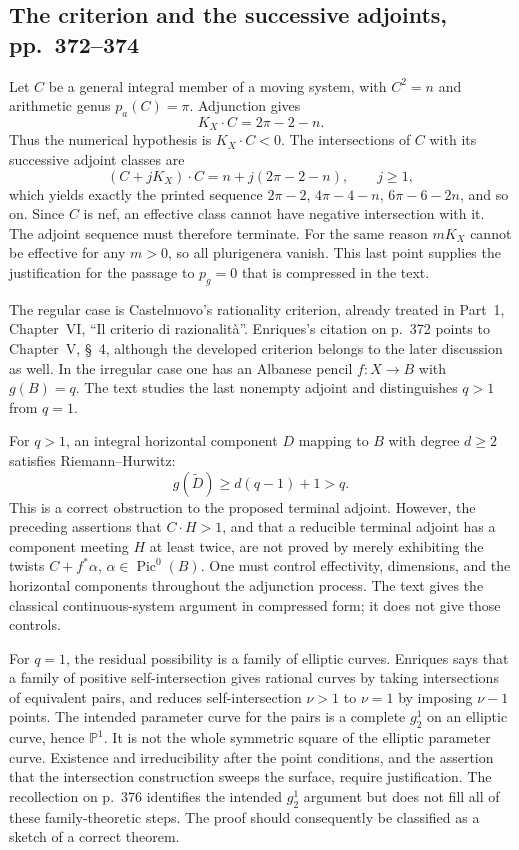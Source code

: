 \subsection{The criterion and the successive adjoints, pp.~372--374}

Let $C$ be a general integral member of a moving system, with $C^2=n$ and arithmetic genus $p_a(C)=\pi$. Adjunction gives
\[
 K_X\cdot C=2\pi-2-n.
\]
Thus the numerical hypothesis is $K_X\cdot C<0$. The intersections of $C$ with its successive adjoint classes are
\[
 (C+jK_X)\cdot C=n+j(2\pi-2-n),\qquad j\geq1,
\]
which yields exactly the printed sequence $2\pi-2$, $4\pi-4-n$, $6\pi-6-2n$, and so on. Since $C$ is nef, an effective class cannot have negative intersection with it. The adjoint sequence must therefore terminate. For the same reason $mK_X$ cannot be effective for any $m>0$, so all plurigenera vanish. This last point supplies the justification for the passage to $p_g=0$ that is compressed in the text.

The regular case is Castelnuovo's rationality criterion, already treated in Part~1, Chapter~VI, ``Il criterio di razionalit\`a''. Enriques's citation on p.~372 points to Chapter~V, \S~4, although the developed criterion belongs to the later discussion as well. In the irregular case one has an Albanese pencil $f:X\to B$ with $g(B)=q$. The text studies the last nonempty adjoint and distinguishes $q>1$ from $q=1$.

For $q>1$, an integral horizontal component $D$ mapping to $B$ with degree $d\geq2$ satisfies Riemann--Hurwitz:
\[
 g(\widetilde D)\geq d(q-1)+1>q.
\]
This is a correct obstruction to the proposed terminal adjoint. However, the preceding assertions that $C\cdot H>1$, and that a reducible terminal adjoint has a component meeting $H$ at least twice, are not proved by merely exhibiting the twists $C+f^*\alpha$, $\alpha\in\operatorname{Pic}^0(B)$. One must control effectivity, dimensions, and the horizontal components throughout the adjunction process. The text gives the classical continuous-system argument in compressed form; it does not give those controls.

For $q=1$, the residual possibility is a family of elliptic curves. Enriques says that a family of positive self-intersection gives rational curves by taking intersections of equivalent pairs, and reduces self-intersection $\nu>1$ to $\nu=1$ by imposing $\nu-1$ points. The intended parameter curve for the pairs is a complete $g^1_2$ on an elliptic curve, hence $\mathbb P^1$. It is not the whole symmetric square of the elliptic parameter curve. Existence and irreducibility after the point conditions, and the assertion that the intersection construction sweeps the surface, require justification. The recollection on p.~376 identifies the intended $g^1_2$ argument but does not fill all of these family-theoretic steps. The proof should consequently be classified as a sketch of a correct theorem.

